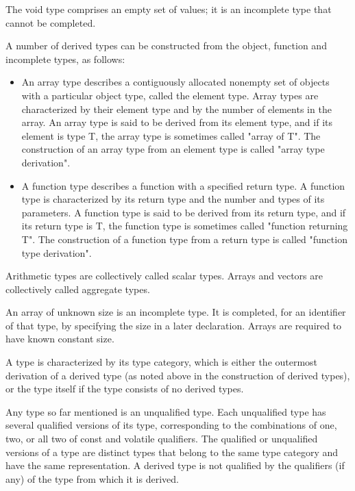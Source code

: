 \documentclass{article}
\begin{document}
The void type comprises an empty set of values; it is an incomplete type that cannot be
completed.
\linebreak

A number of derived types can be constructed from the object, function and incomplete 
types, as follows:
\linebreak

\begin{itemize}
	\item An array type describes a contiguously allocated nonempty set of objects with a 
          particular object type, called the element type. Array types are characterized 
          by their element type and by the number of elements in the array.  An array type
          is said to be derived	from its element type, and if its element is type T, the 
          array type is sometimes called "array of T".  The construction of an array type
          from an element type is called "array type derivation".
	\item A function type describes a function with a specified return type. A function
          type is characterized by its return type and the number and types of its
          parameters. A function type is said to be derived from its return type, and if 
          its return type is T, the function type is sometimes called "function returning
          T". The construction of a function type from a return type is called "function
          type derivation".
\end{itemize}

Arithmetic types are collectively called scalar types. Arrays and vectors are 
collectively called aggregate types.
\linebreak

An array of unknown size is an incomplete type.  It is completed, for an identifier of 
that type, by specifying the size in a later declaration.  Arrays are required to have 
known constant size.
\linebreak

A type is characterized by its type category, which is either the outermost derivation 
of a derived type (as noted above in the construction of derived types), or the type 
itself if the type consists of no derived types.
\linebreak

Any type so far mentioned is an unqualified type.  Each unqualified type has several 
qualified versions of its type, corresponding to the combinations of one, two, or all 
two of const and volatile qualifiers.  The qualified or unqualified versions of a type 
are distinct types that belong to the same type category and have the same representation.
A derived type is not qualified by the qualifiers (if any) of the type from which it 
is derived.
\linebreak
\end{document}
